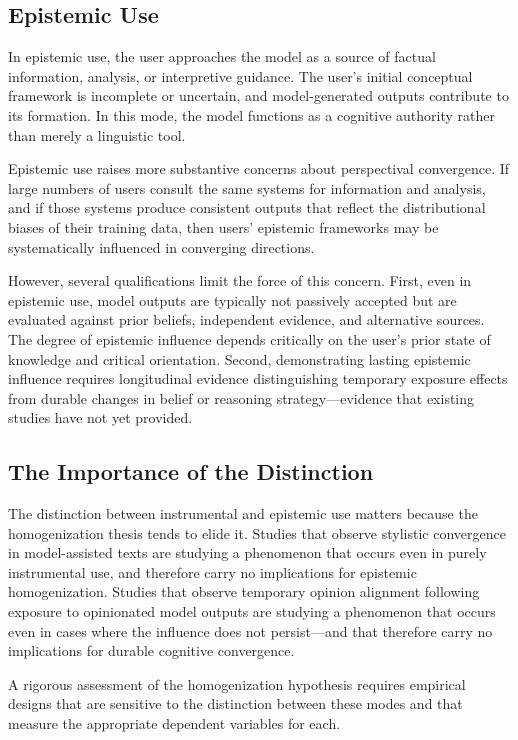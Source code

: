 \documentclass[12pt,a4paper]{article}
\theoremstyle{definition}
\theoremstyle{plain}
\theoremstyle{remark}
\begin{document}
\subsection{Epistemic Use}

In epistemic use, the user approaches the model as a source of factual information, analysis,
or interpretive guidance. The user's initial conceptual framework is incomplete or uncertain,
and model-generated outputs contribute to its formation. In this mode, the model functions
as a cognitive authority rather than merely a linguistic tool.

Epistemic use raises more substantive concerns about perspectival convergence. If large
numbers of users consult the same systems for information and analysis, and if those systems
produce consistent outputs that reflect the distributional biases of their training data,
then users' epistemic frameworks may be systematically influenced in converging directions.

However, several qualifications limit the force of this concern. First, even in epistemic
use, model outputs are typically not passively accepted but are evaluated against prior
beliefs, independent evidence, and alternative sources. The degree of epistemic influence
depends critically on the user's prior state of knowledge and critical orientation.
Second, demonstrating lasting epistemic influence requires longitudinal evidence distinguishing
temporary exposure effects from durable changes in belief or reasoning strategy---evidence
that existing studies have not yet provided.

\subsection{The Importance of the Distinction}

The distinction between instrumental and epistemic use matters because the homogenization
thesis tends to elide it. Studies that observe stylistic convergence in model-assisted texts
are studying a phenomenon that occurs even in purely instrumental use, and therefore carry no
implications for epistemic homogenization. Studies that observe temporary opinion alignment
following exposure to opinionated model outputs are studying a phenomenon that occurs even in
cases where the influence does not persist---and that therefore carry no implications for
durable cognitive convergence.

A rigorous assessment of the homogenization hypothesis requires empirical designs that are
sensitive to the distinction between these modes and that measure the appropriate dependent
variables for each.
\end{document}

